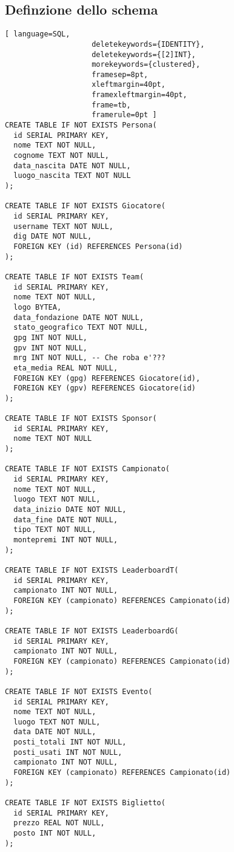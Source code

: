 \documentclass{article}
\begin{document}
\subsection{Definzione dello schema}

\begin{lstlisting}[ language=SQL,
                    deletekeywords={IDENTITY},
                    deletekeywords={[2]INT},
                    morekeywords={clustered},
                    framesep=8pt,
                    xleftmargin=40pt,
                    framexleftmargin=40pt,
                    frame=tb,
                    framerule=0pt ]
CREATE TABLE IF NOT EXISTS Persona(
  id SERIAL PRIMARY KEY,
  nome TEXT NOT NULL,
  cognome TEXT NOT NULL,
  data_nascita DATE NOT NULL,
  luogo_nascita TEXT NOT NULL
);

CREATE TABLE IF NOT EXISTS Giocatore(
  id SERIAL PRIMARY KEY,
  username TEXT NOT NULL,
  dig DATE NOT NULL,
  FOREIGN KEY (id) REFERENCES Persona(id)
);

CREATE TABLE IF NOT EXISTS Team(
  id SERIAL PRIMARY KEY,
  nome TEXT NOT NULL,
  logo BYTEA,
  data_fondazione DATE NOT NULL,
  stato_geografico TEXT NOT NULL,
  gpg INT NOT NULL,
  gpv INT NOT NULL,
  mrg INT NOT NULL, -- Che roba e'???
  eta_media REAL NOT NULL,
  FOREIGN KEY (gpg) REFERENCES Giocatore(id),
  FOREIGN KEY (gpv) REFERENCES Giocatore(id)
);

CREATE TABLE IF NOT EXISTS Sponsor(
  id SERIAL PRIMARY KEY,
  nome TEXT NOT NULL
);

CREATE TABLE IF NOT EXISTS Campionato(
  id SERIAL PRIMARY KEY,
  nome TEXT NOT NULL,
  luogo TEXT NOT NULL,
  data_inizio DATE NOT NULL,
  data_fine DATE NOT NULL,
  tipo TEXT NOT NULL,
  montepremi INT NOT NULL,
);

CREATE TABLE IF NOT EXISTS LeaderboardT(
  id SERIAL PRIMARY KEY,
  campionato INT NOT NULL,
  FOREIGN KEY (campionato) REFERENCES Campionato(id)
);

CREATE TABLE IF NOT EXISTS LeaderboardG(
  id SERIAL PRIMARY KEY,
  campionato INT NOT NULL,
  FOREIGN KEY (campionato) REFERENCES Campionato(id)
);

CREATE TABLE IF NOT EXISTS Evento(
  id SERIAL PRIMARY KEY,
  nome TEXT NOT NULL,
  luogo TEXT NOT NULL,
  data DATE NOT NULL,
  posti_totali INT NOT NULL,
  posti_usati INT NOT NULL,
  campionato INT NOT NULL,
  FOREIGN KEY (campionato) REFERENCES Campionato(id)
);

CREATE TABLE IF NOT EXISTS Biglietto(
  id SERIAL PRIMARY KEY,
  prezzo REAL NOT NULL,
  posto INT NOT NULL,
);


\end{lstlisting}
\end{document}
